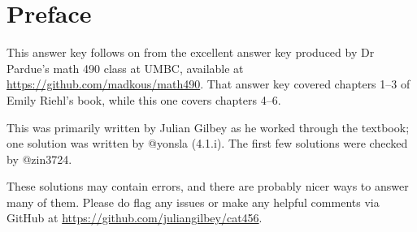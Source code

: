 \documentclass[main]{subfiles}
\begin{document}
\chapter*{Preface}

This answer key follows on from the excellent answer key produced by
Dr Pardue's math 490 class at UMBC, available at
\url{https://github.com/madkous/math490}.  That answer key covered
chapters 1--3 of Emily Riehl's book, while this one covers chapters
4--6.

This was primarily written by Julian Gilbey as he worked through the
textbook; one solution was written by @yonsla (4.1.i).  The first few
solutions were checked by @zin3724.

These solutions may contain errors, and there are probably nicer ways
to answer many of them.  Please do flag any issues or make any helpful
comments via GitHub at \url{https://github.com/juliangilbey/cat456}.
\end{document}
